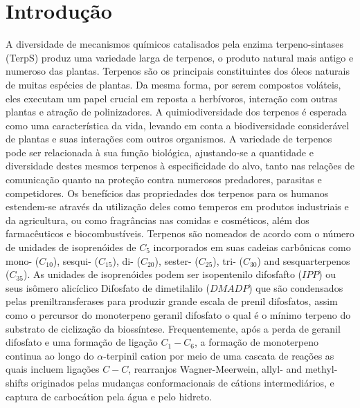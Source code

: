 \chapter{Introdução}\label{Introducao}
A diversidade de mecanismos químicos catalisados pela enzima terpeno-sintases (TerpS) produz uma variedade larga de terpenos, o produto natural mais antigo e numeroso das plantas. Terpenos são os principais constituintes dos óleos naturais de muitas espécies de plantas. Da mesma forma, por serem compostos voláteis, eles executam um papel crucial em reposta a herbívoros, interação com outras plantas e atração de polinizadores. A quimiodiversidade dos terpenos é esperada como uma característica da vida, levando em conta a biodiversidade considerável de plantas e suas interações com outros organismos. A variedade de terpenos pode ser relacionada à sua função biológica, ajustando-se a quantidade e diversidade destes mesmos terpenos à especificidade do alvo, tanto nas relações de comunicação quanto na proteção contra numerosos predadores, parasitas e competidores. Os benefícios das propriedades dos terpenos para os humanos estendem-se através da utilização deles como temperos em produtos industriais e da agricultura, ou como fragrâncias nas comidas e cosméticos, além dos farmacêuticos e biocombustíveis. Terpenos são nomeados de acordo com o número de unidades de isoprenóides de $C_5$ incorporados em suas cadeias carbônicas como mono- ($C_{10}$), sesqui- ($C_{15}$), di- ($C_{20}$), sester- ($C_{25}$), tri- ($C_{30}$) and sesquarterpenos ($C_{35}$). As unidades de isoprenóides podem ser isopentenilo difosfafto ($IPP$) ou seus isômero alicíclico Difosfato de dimetilalilo ($DMADP$) que são condensados pelas preniltransferases para produzir grande escala de prenil difosfatos, assim como o percursor do monoterpeno geranil difosfato o qual é o mínimo terpeno do substrato de ciclização da biossíntese. Frequentemente, após a perda de geranil difosfato e uma formação de ligação  $C_1-C_6$, a formação de monoterpeno continua ao longo do $\alpha$-terpinil cation por meio de uma cascata de reações as quais incluem ligações $C-C$, rearranjos Wagner-Meerwein,  allyl- and methyl-shifts originados pelas mudanças conformacionais de cátions intermediários, e captura de carbocátion pela água e pelo hidreto.  

